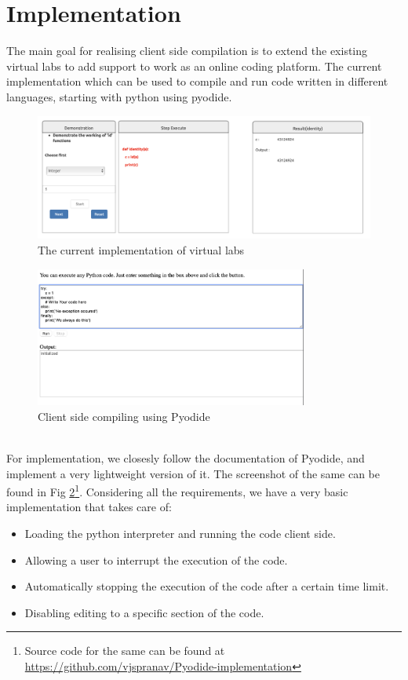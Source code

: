 \section{Implementation}
The main goal for realising client side compilation is to extend the existing virtual labs to add support to work as an online coding platform. The current implementation which can be used to compile and run code written in different languages, starting with python using pyodide.
\begin{figure}[h]
    \centering
    \includegraphics[width=0.8\linewidth]{images/existing-vlabs.png}
    \caption{The current implementation of virtual labs}
    \label{fig:existing-vlabs}
\end{figure}
\begin{figure}[h]
    \centering
    \includegraphics[width=0.8\textwidth]{images/impl-demo.png}
    \caption{Client side compiling using Pyodide}
    \label{fig:implementation}
\end{figure}
\\
For implementation, we closesly follow the documentation of Pyodide, and implement a very lightweight version of it. The screenshot of the same can be found in Fig \ref{fig:implementation}\footnote{Source code for the same can be found at \url{https://github.com/vjspranav/Pyodide-implementation}}. Considering all the requirements, we have a very basic implementation that takes care of:
\begin{itemize}
    \item Loading the python interpreter and running the code client side.
    \item Allowing a user to interrupt the execution of the code.
    \item Automatically stopping the execution of the code after a certain time limit.
    \item Disabling editing to a specific section of the code.
\end{itemize}


